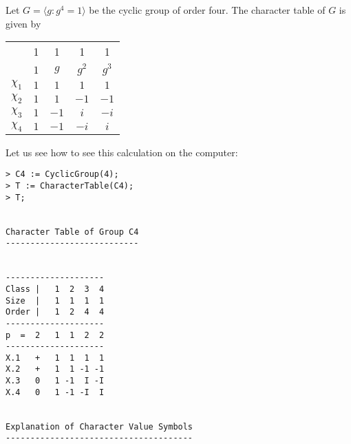 \begin{example}
	Let $G=\langle g:g^4=1\rangle$ 
	be the cyclic group of order four. The character table of $G$ is given by
	\begin{center}
		\begin{tabular}{|c|cccc|}
			\hline 
			& 1 & 1 & 1 & 1\tabularnewline
			& $1$ & $g$ & $g^2$ & $g^{3}$\tabularnewline
			\hline 
			$\chi_{1}$ & $1$ & $1$ & $1$ & $1$\tabularnewline
			$\chi_{2}$ & $1$ & $1$ & $-1$ & $-1$ \tabularnewline
			$\chi_{3}$ & $1$ & $-1$ & $i$ & $-i$\tabularnewline
			$\chi_{4}$ & $1$ & $-1$ & $-i$ & $i$\tabularnewline
			\hline
		\end{tabular}
	\end{center}
 Let us see how to see this calculation on the computer:




\begin{lstlisting}
> C4 := CyclicGroup(4);
> T := CharacterTable(C4);
> T;


Character Table of Group C4
---------------------------


--------------------
Class |   1  2  3  4
Size  |   1  1  1  1
Order |   1  2  4  4
--------------------
p  =  2   1  1  2  2
--------------------
X.1   +   1  1  1  1
X.2   +   1  1 -1 -1
X.3   0   1 -1  I -I
X.4   0   1 -1 -I  I


Explanation of Character Value Symbols
--------------------------------------


\end{lstlisting}
\end{example}
